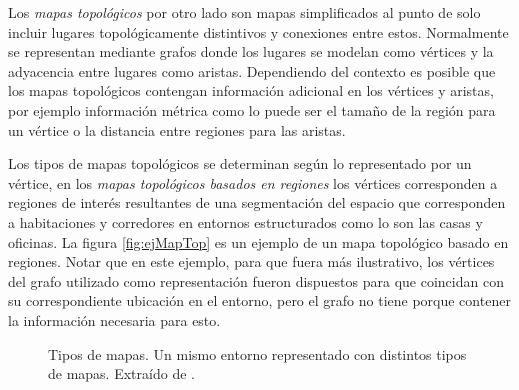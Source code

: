 Los \emph{mapas topológicos} por otro lado son mapas simplificados al punto de solo incluir lugares topológicamente distintivos y conexiones entre estos. Normalmente se representan mediante grafos donde los lugares se modelan como vértices y la adyacencia entre lugares como aristas. Dependiendo del contexto es posible que los mapas topológicos contengan información adicional en los vértices y aristas, por ejemplo información métrica como lo puede ser el tamaño de la región para un vértice o la distancia entre regiones para las aristas.

Los tipos de mapas topológicos se determinan según lo representado por un vértice, en los \emph{mapas topológicos basados en regiones} los vértices corresponden a regiones de interés resultantes de una segmentación del espacio que corresponden a habitaciones y corredores en entornos estructurados como lo son las casas y oficinas. La figura \ref{fig:ejMapTop} es un ejemplo de un mapa topológico basado en regiones. Notar que en este ejemplo, para que fuera más ilustrativo, los vértices del grafo utilizado como representación fueron dispuestos para que coincidan con su correspondiente ubicación en el entorno, pero el grafo no tiene porque contener la información necesaria para esto.

\begin{figure}[H]
  \centering
  \qquad
  \qquad
  \caption[Tipos de mapas.]{Tipos de mapas. Un mismo entorno representado con distintos tipos de mapas. Extraído de \cite{choset2005principles}.}
\end{figure}

